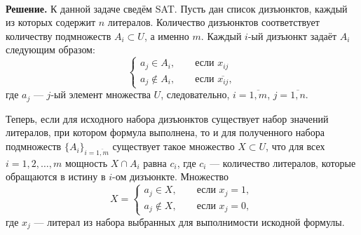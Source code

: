 \documentclass[10pt]{article}
\begin{document}
\ \\[0.2cm]
\textbf{Решение.} К данной задаче сведём SAT. Пусть дан список дизъюнктов, каждый из которых содержит $n$ литералов. Количество дизъюнктов соответствует количеству подмножеств $A_i\subset U$, а именно $m$. Каждый $i$-ый дизъюнкт задаёт $A_i$ следующим образом: $$\begin{cases}
a_j \in A_i,\qquad\text{если } x_{ij}\\
a_j\notin A_i,\qquad\text{если } \overline{x_{ij}},
\end{cases}
$$
где $a_j$ --- $j$-ый элемент множества $U$, следовательно, $i = \overline{1, m}$, $j = \overline{1, n}$.
\medskip\par
Теперь, если для исходного набора дизъюнктов существует набор значений литералов, при котором формула выполнена, то и для полученного набора подмножеств $\{A_i\}_{i=\overline{1,m}}$ существует такое множество $X\subset U$, что для всех $i = 1, 2, \dots, m$ мощность $X \cap A_i$ равна $c_i$, где $c_i$ --- количество литералов, которые обращаются в истину в $i$-ом дизъюнкте. Множество $$X = \begin{cases} a_j\in X,\qquad\text{если } x_j = 1,\\
a_j\notin X,\qquad\text{если } x_j = 0,
\end{cases}$$
где $x_j$ --- литерал из набора выбранных для выполнимости искодной формулы.
\end{document}
